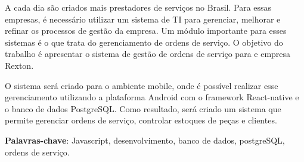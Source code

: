 \setlength{\absparsep}{18pt} %
\begin{resumo}
A cada dia são criados mais prestadores de serviços no Brasil. Para essas empresas, é necessário utilizar um sistema de TI para gerenciar, melhorar e refinar os processos de gestão da empresa. Um módulo importante para esses sistemas é o que trata do gerenciamento de ordens de serviço. O objetivo do trabalho é apresentar o sistema de gestão de ordens de serviço para e empresa Rexton.

O sistema será criado para o ambiente mobile, onde é possível realizar esse gerenciamento utilizando a plataforma Android com o framework React-native e o banco de dados PostgreSQL. Como resultado, será criado um sistema que permite gerenciar ordens de serviço, controlar estoques de peças e clientes.
	
\textbf{Palavras-chave}: Javascript, desenvolvimento, banco de dados, postgreSQL, ordens de serviço.

\end{resumo}